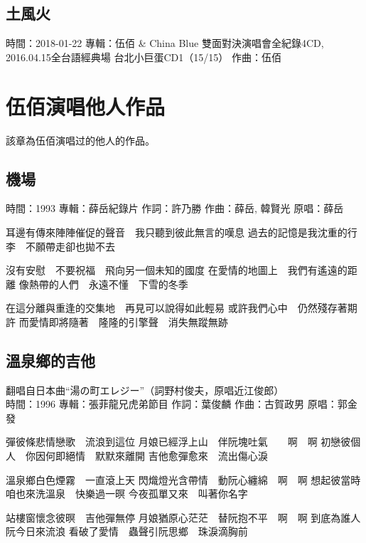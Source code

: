 \documentclass[UTF8,a4paper,oneside,twocolumn,12pt]{ctexbook}
\newcommand{\infopair}[2]{\textbullet #1：#2}
\newcommand{\zc}[1][伍佰]{\infopair{作詞}{#1}}
\newcommand{\zq}[1][伍佰]{\infopair{作曲}{#1}}
\newcommand{\zj}[1]{\infopair{專輯}{#1}}
\newcommand{\yc}[1]{\infopair{原唱}{#1}}
\newcommand{\sj}[1]{\infopair{時間}{#1}}
\newenvironment{info}{\begin{flushleft}\kaishu
	}
	{\end{flushleft}\normalsize\yahei\par}
\newenvironment{lyric}{
	}
{}
\begin{document}
\section{土風火}
\begin{info}
	\sj{2018-01-22}
	\zj{伍佰 \& China Blue 雙面對決演唱會全紀錄4CD,
		2016.04.15全台語經典場 台北小巨蛋CD1（15/15）}
	\zq
\end{info}

\chapter{伍佰演唱他人作品}
該章為伍佰演唱过的他人的作品。

\section{機場}
\begin{info}
	\sj{1993}
	\zj{薛岳紀錄片}
	\zc[許乃勝]
	\zq[薛岳, 韓賢光]
	\yc{薛岳}
\end{info}
\begin{lyric}
	耳邊有傳來陣陣催促的聲音　我只聽到彼此無言的嘆息
	過去的記憶是我沈重的行李　不願帶走卻也拋不去

	沒有安慰　不要祝福　飛向另一個未知的國度
	在愛情的地圖上　我們有遙遠的距離
	像熱帶的人們　永遠不懂　下雪的冬季

	在這分離與重逢的交集地　再見可以說得如此輕易
	或許我們心中　仍然殘存著期許
	而愛情即將隨著　隆隆的引擎聲　消失無蹤無跡
\end{lyric}

\section{溫泉鄉的吉他} %
\begin{info}
	翻唱自日本曲“湯の町エレジー”（詞野村俊夫，原唱近江俊郎） \\

	\sj{1996}
	\zj{張菲龍兄虎弟節目}
	\zc[葉俊麟]
	\zq[古賀政男]
	\yc{郭金發}
\end{info}
\begin{lyric}
	彈彼條悲情戀歌　流浪到這位
	月娘已經浮上山　伴阮塊吐氣　　啊　啊
	初戀彼個人　你因何即絕情　默默來離開
	吉他愈彈愈來　流出傷心淚

	溫泉鄉白色煙霧　一直滾上天
	閃熾燈光含帶情　動阮心纏綿　啊　啊
	想起彼當時　咱也來洗溫泉　快樂過一暝
	今夜孤單又來　叫著你名字

	站樓窗懷念彼暝　吉他彈無停
	月娘猶原心茫茫　替阮抱不平　啊　啊
	到底為誰人　阮今日來流浪
	看破了愛情　蟲聲引阮思鄉　珠淚滴胸前
\end{lyric}
\end{document}
